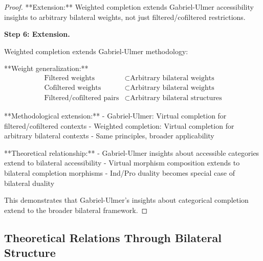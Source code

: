 \documentclass[11pt]{article}
\theoremstyle{plain}
\theoremstyle{definition}
\theoremstyle{remark}
\begin{document}
\begin{proof}
**Extension:** Weighted completion extends Gabriel-Ulmer accessibility insights to arbitrary bilateral weights, not just filtered/cofiltered restrictions.

\textbf{Step 6: Extension.}

Weighted completion extends Gabriel-Ulmer methodology:

**Weight generalization:**
\begin{align}
\text{Filtered weights} &\subset \text{Arbitrary bilateral weights} \\
\text{Cofiltered weights} &\subset \text{Arbitrary bilateral weights} \\
\text{Filtered/cofiltered pairs} &\subset \text{Arbitrary bilateral structures}
\end{align}

**Methodological extension:**
- Gabriel-Ulmer: Virtual completion for filtered/cofiltered contexts
- Weighted completion: Virtual completion for arbitrary bilateral contexts
- Same principles, broader applicability

**Theoretical relationship:**
- Gabriel-Ulmer insights about accessible categories extend to bilateral accessibility
- Virtual morphism composition extends to bilateral completion morphisms
- Ind/Pro duality becomes special case of bilateral duality

This demonstrates that Gabriel-Ulmer's insights about categorical completion extend to the broader bilateral framework.
\end{proof}

\subsection{Theoretical Relations Through Bilateral Structure}
\end{document}
